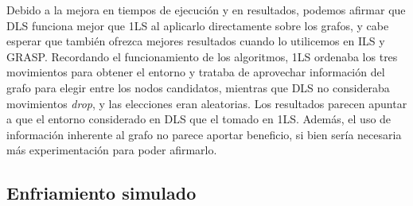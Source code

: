 Debido a la mejora en tiempos de ejecución y en resultados, podemos afirmar que
DLS funciona mejor que 1LS al aplicarlo directamente sobre los grafos, y cabe esperar
que también ofrezca mejores resultados cuando lo utilicemos en ILS y GRASP.
Recordando el funcionamiento de los algoritmos, 1LS ordenaba los tres movimientos
para obtener el entorno y trataba de aprovechar información del grafo para elegir
entre los nodos candidatos, mientras que DLS no consideraba movimientos \textit{drop},
y las elecciones eran aleatorias. Los resultados parecen apuntar a que el entorno
considerado en DLS que el tomado en 1LS. Además, el uso de información inherente
al grafo no parece aportar beneficio, si bien sería necesaria más experimentación
para poder afirmarlo.

\subsection{Enfriamiento simulado}

